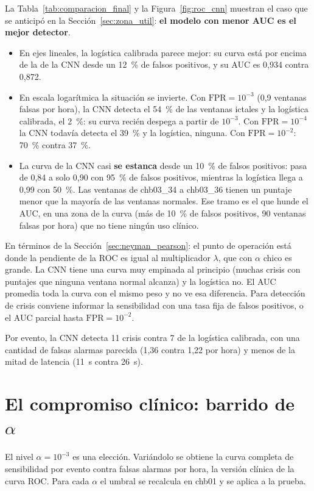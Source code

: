 La Tabla~\ref{tab:comparacion_final} y la Figura~\ref{fig:roc_cnn} muestran el caso que se anticipó en la
Sección~\ref{sec:zona_util}: \textbf{el modelo con menor AUC es el mejor detector}.
\begin{itemize}
  \item En ejes lineales, la logística calibrada parece mejor: su curva está por encima de la de la CNN desde un 12~\% de
        falsos positivos, y su AUC es 0,934 contra 0,872.
  \item En escala logarítmica la situación se invierte. Con $\text{FPR} = 10^{-3}$ (0,9 ventanas falsas por hora), la CNN detecta
        el 54~\% de las ventanas ictales y la logística calibrada, el 2~\%: su curva recién despega a partir de $10^{-3}$. Con
        $\text{FPR} = 10^{-4}$ la CNN todavía detecta el 39~\% y la logística, ninguna. Con $\text{FPR} = 10^{-2}$: 70~\% contra 37~\%.
  \item La curva de la CNN casi \textbf{se estanca} desde un 10~\% de falsos positivos: pasa de 0,84 a solo 0,90 con 95~\% de
        falsos positivos, mientras la logística llega a 0,99 con 50~\%. Las ventanas de chb03\_34 a chb03\_36 tienen un puntaje
        menor que la mayoría de las ventanas normales. Ese tramo es el que hunde el AUC, en una zona de la curva (más de
        10~\% de falsos positivos, 90 ventanas falsas por hora) que no tiene ningún uso clínico.
\end{itemize}

En términos de la Sección~\ref{sec:neyman_pearson}: el punto de operación está donde la pendiente de la ROC es igual al
multiplicador $\lambda$, que con $\alpha$ chico es grande. La CNN tiene una curva muy empinada al principio (muchas crisis con
puntajes que ninguna ventana normal alcanza) y la logística no. El AUC promedia toda la curva con el mismo peso y no ve esa
diferencia. Para detección de crisis conviene informar la sensibilidad con una tasa fija de falsos positivos, o el AUC parcial
hasta $\text{FPR} = 10^{-2}$.

Por evento, la CNN detecta 11 crisis contra 7 de la logística calibrada, con una cantidad de falsas alarmas parecida
(1,36 contra 1,22 por hora) y menos de la mitad de latencia (11~s contra 26~s).

\section{El compromiso clínico: barrido de $\alpha$}
\label{sec:res_barrido}

El nivel $\alpha = 10^{-3}$ es una elección. Variándolo se obtiene la curva completa de sensibilidad por evento contra falsas
alarmas por hora, la versión clínica de la curva ROC. Para cada $\alpha$ el umbral se recalcula en chb01 y se aplica a la
prueba.

